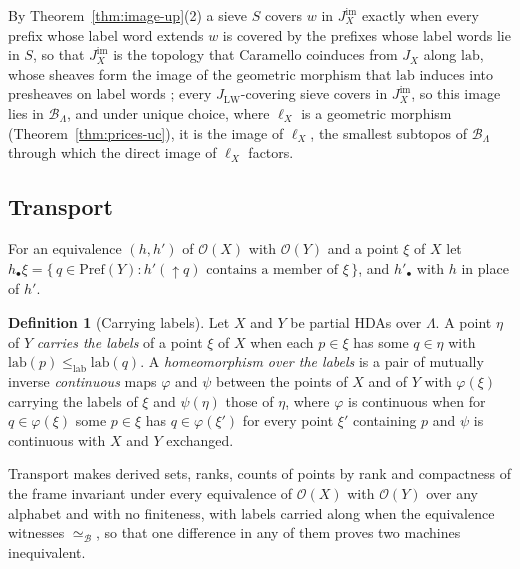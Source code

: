 \documentclass{lmcs}
\theoremstyle{definition}
\newtheorem{definition}[theorem]{Definition}
\theoremstyle{remark}
\newcommand{\Op}{\mathcal{O}}
\newcommand{\JLW}{J_{\LW}}
\newcommand{\Pref}{\mathrm{Pref}}
\newcommand{\JX}[1]{J_{#1}}
\newcommand{\upc}[1]{{\uparrow}#1}
\newcommand{\lab}{\mathrm{lab}}
\newcommand{\lle}{\leq_{\mathrm{lab}}}
\newcommand{\LW}{\mathrm{LW}}
\providecommand{\lab}{\mathrm{lab}}
\providecommand{\BL}{\mathcal{B}_{\Lambda}}
\providecommand{\eqB}{\simeq_{\mathcal{B}}}
\providecommand{\Jim}[1]{J^{\mathrm{im}}_{#1}}
\begin{document}
By Theorem~\ref{thm:image-up}(2) a sieve $S$ covers $w$ in $\Jim{X}$ exactly when every prefix whose label word
extends $w$ is covered by the prefixes whose label words lie in $S$, so that $\Jim{X}$ is the
topology that Caramello coinduces from $\JX{X}$ along $\lab$, whose sheaves form the image of the geometric morphism
that $\lab$ induces into presheaves on label words \cite{Caramello19}; every
$\JLW$-covering sieve covers in $\Jim{X}$, so this image lies in $\BL$, and under unique choice, where $\ell_X$ is a geometric morphism
(Theorem~\ref{thm:prices-uc}), it is the image of $\ell_X$, the smallest subtopos of $\BL$ through which the direct image
of $\ell_X$ factors.

\subsection{Transport}\label{ssec:transport}

For an equivalence $(h,h')$ of $\Op(X)$ with $\Op(Y)$ and a point $\xi$ of $X$ let
$h_\bullet\xi=\{\,q\in\Pref(Y) : h'(\upc{q})\text{ contains a member of }\xi\,\}$, and $h'_\bullet$ with $h$ in place of
$h'$.

\begin{definition}[Carrying labels]\label{def:carries}
Let $X$ and $Y$ be partial HDAs over $\Lambda$. A point $\eta$ of $Y$ \emph{carries the labels} of a point $\xi$ of $X$
when each $p\in\xi$ has some $q\in\eta$ with $\lab(p)\lle\lab(q)$. A \emph{homeomorphism over the labels} is a pair of mutually inverse
\emph{continuous} maps $\varphi$ and $\psi$ between the points of $X$ and of $Y$ with $\varphi(\xi)$ carrying the
labels of $\xi$ and $\psi(\eta)$ those of $\eta$, where $\varphi$ is continuous when for $q\in\varphi(\xi)$ some
$p\in\xi$ has $q\in\varphi(\xi')$ for every point $\xi'$ containing $p$ and $\psi$ is continuous with $X$ and $Y$
exchanged.
\end{definition}

Transport makes derived sets, ranks, counts of points by rank and compactness of the frame invariant under every
equivalence of $\Op(X)$ with $\Op(Y)$ over any alphabet and with no finiteness, with labels carried along when the
equivalence witnesses $\eqB$, so that one difference in any of them proves two machines inequivalent.
\end{document}
